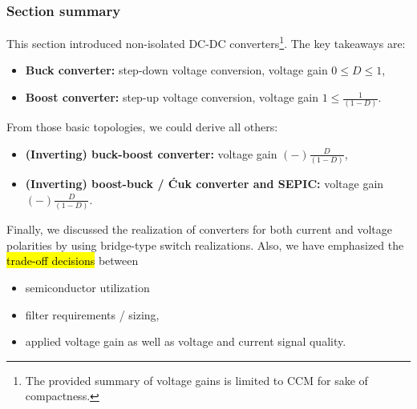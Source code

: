 \begin{frame}
	\frametitle{Section summary}
	This section introduced non-isolated DC-DC converters\footnote{The provided summary of voltage gains is limited to CCM for sake of compactness.}. The key takeaways are:
	\begin{itemize}
		\item \textbf{Buck converter:} step-down voltage conversion, voltage gain $0\leq D\leq1$,\pause
		\item \textbf{Boost converter:} step-up voltage conversion, voltage gain $1 \leq \frac{1}{(1-D)}$. \pause
	\end{itemize}
	From those basic topologies, we could derive all others:
	\begin{itemize}
		\item \textbf{(Inverting) buck-boost converter:} voltage gain $(-)\frac{D}{(1-D)}$, \pause
		\item \textbf{(Inverting) boost-buck / Ćuk converter and SEPIC:}  voltage gain $(-)\frac{D}{(1-D)}$. \pause
	\end{itemize}
	Finally, we discussed the realization of converters for both current and voltage polarities by using bridge-type switch realizations. \pause  Also, we have emphasized the \hl{trade-off decisions} between%
	\begin{itemize}
		\item semiconductor utilization \pause
		\item filter requirements / sizing, \pause
		\item applied voltage gain as well as voltage and current signal quality.
	\end{itemize}
\end{frame}